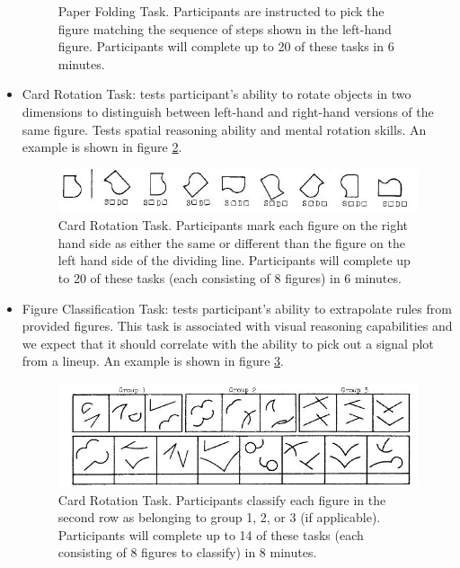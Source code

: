 \documentclass[11pt]{isuthesis}\usepackage[]{graphicx}\usepackage[]{color}
\begin{document}
\begin{itemize}
\begin{figure}[htbp]
\caption[Paper Folding Task]{Paper Folding Task. Participants are instructed to pick the figure matching the sequence of steps shown in the left-hand figure. Participants will complete up to 20 of these tasks in 6 minutes.}\label{fig:paperfolding}
\end{figure}
\item Card Rotation Task: tests participant's ability to rotate objects in two dimensions to distinguish between left-hand and right-hand versions of the same figure. Tests spatial reasoning ability and mental rotation skills. An example is shown in figure \ref{fig:cardrotation}.
\begin{figure}[htbp]\centering
\includegraphics[width=.9\textwidth]{cardrotation}
\caption[Card Rotation Task]{Card Rotation Task. Participants mark each figure on the right hand side as either the same or different than the figure on the left hand side of the dividing line. Participants will complete up to 20 of these tasks (each consisting of 8 figures) in 6 minutes.}\label{fig:cardrotation}
\end{figure}
\item Figure Classification Task: tests participant's ability to extrapolate rules from provided figures. This task is associated with visual reasoning capabilities and we expect that it should correlate with the ability to pick out a signal plot from a lineup. An example is shown in figure \ref{fig:figureclassification}. 
\begin{figure}[htbp]\centering
\includegraphics[width=.9\textwidth]{figureclassification}
\caption[Figure Classification Task]{Card Rotation Task. Participants classify each figure in the second row as belonging to group 1, 2, or 3 (if applicable). Participants will complete up to 14 of these tasks (each consisting of 8 figures to classify) in 8 minutes.}\label{fig:figureclassification}
\end{figure}
\end{itemize}
\end{document}
